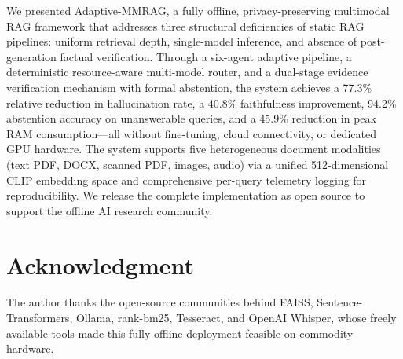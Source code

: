 \documentclass[conference]{IEEEtran}
\begin{document}
We presented Adaptive-MMRAG, a fully offline, privacy-preserving multimodal
RAG framework that addresses three structural deficiencies of static RAG
pipelines: uniform retrieval depth, single-model inference, and absence of
post-generation factual verification. Through a six-agent adaptive pipeline,
a deterministic resource-aware multi-model router, and a dual-stage evidence
verification mechanism with formal abstention, the system achieves a 77.3\%
relative reduction in hallucination rate, a 40.8\% faithfulness improvement,
94.2\% abstention accuracy on unanswerable queries, and a 45.9\% reduction
in peak RAM consumption—all without fine-tuning, cloud connectivity, or
dedicated GPU hardware. The system supports five heterogeneous document
modalities (text PDF, DOCX, scanned PDF, images, audio) via a unified
512-dimensional CLIP embedding space and comprehensive per-query telemetry
logging for reproducibility. We release the complete implementation as open
source to support the offline AI research community.

\section*{Acknowledgment}
The author thanks the open-source communities behind FAISS, Sentence-Transformers,
Ollama, rank-bm25, Tesseract, and OpenAI Whisper, whose freely available tools
made this fully offline deployment feasible on commodity hardware.
\end{document}
